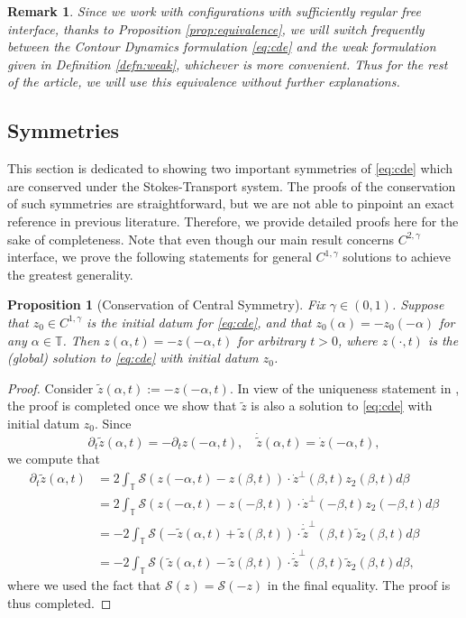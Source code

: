 \documentclass[11pt]{article}
\numberwithin{equation}{section}
\newtheorem{prop}[thm]{Proposition}
\newtheorem{rmk}[thm]{Remark}
\newcommand{\T}{\mathbb{T}}
\newcommand{\calS}{\mathcal{S}}
\newcommand{\dotz}{\dot{z}}
\newcommand{\p}{\partial}
\begin{document}
\begin{rmk}
    Since we work with configurations with sufficiently regular free interface, thanks to Proposition \ref{prop:equivalence}, we will switch frequently between the Contour Dynamics formulation \eqref{eq:cde} and the weak formulation given in Definition \ref{defn:weak}, whichever is more convenient. Thus for the rest of the article, we will use this equivalence without further explanations.
\end{rmk}


\subsection{Symmetries}
This section is dedicated to showing two important symmetries of \eqref{eq:cde} which are conserved under the Stokes-Transport system. The proofs of the conservation of such symmetries are straightforward, but we are not able to pinpoint an exact reference in previous literature. Therefore, we provide detailed proofs here for the sake of completeness. Note that even though our main result concerns $C^{2,\gamma}$ interface, we prove the following statements for general $C^{1,\gamma}$ solutions to achieve the greatest generality.
\begin{prop}[Conservation of Central Symmetry]\label{prop:central}
    Fix $\gamma \in (0,1)$. Suppose that $z_0 \in C^{1,\gamma}$ is the initial datum for \eqref{eq:cde}, and that $z_0(\alpha) = -z_0(- \alpha)$ for any $\alpha \in \T$. Then $z(\alpha, t) = -z(- \alpha, t)$ for arbitrary $t > 0$, where $z(\cdot, t)$ is the (global) solution to \eqref{eq:cde} with initial datum $z_0$.
\end{prop}
\begin{proof}
    Consider $\tilde{z}(\alpha, t) := -z(-\alpha, t)$. In view of the uniqueness statement in \cite[Theorem 1]{GGS25}, the proof is completed once we show that $\tilde{z}$ is also a solution to \eqref{eq:cde} with initial datum $z_0$. Since
    $$
    \p_t \tilde{z}(\alpha, t) = -\p_t z(- \alpha, t),\quad \dot{\tilde{z}}(\alpha, t) = \dotz(- \alpha, t),
    $$
    we compute that
    \begin{align*}
        \p_t \tilde{z}(\alpha, t) &= 2\int_\T \calS(z(- \alpha, t) - z(\beta, t))\cdot \dotz^\perp(\beta, t)z_2(\beta,t) d\beta\\
        &= 2\int_\T \calS(z( - \alpha, t) - z( - \beta, t))\cdot \dotz^\perp( - \beta, t)z_2(- \beta,t) d\beta\\
        &= -2\int_\T \calS(-\tilde{z}(\alpha, t) + \tilde{z}(\beta, t))\cdot \dot{\tilde{z}}^\perp(\beta, t)\tilde{z}_2(\beta,t) d\beta\\
        &= -2\int_\T \calS(\tilde{z}(\alpha, t) - \tilde{z}(\beta, t))\cdot \dot{\tilde{z}}^\perp(\beta, t)\tilde{z}_2(\beta,t) d\beta,
    \end{align*}
    where we used the fact that $\calS(z) = \calS(-z)$ in the final equality. The proof is thus completed.
\end{proof}
\end{document}
